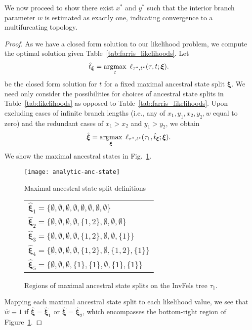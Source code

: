 We now proceed to show there exist $x^*$ and $y^*$ such that the interior branch parameter $w$ is estimated as exactly one, indicating convergence to a multifurcating topology.

\topoInconsist*

\begin{proof}
As we have a closed form solution to our likelihood problem, we compute the optimal solution given Table~\ref{tab:farris_likelihoods}.
Let
\[
\hat{t}_{\boldsymbol\xi} = \operatorname*{argmax}_{t} \ \ell_{\tau^*,t^*}(\tau, t; \boldsymbol\xi).
\]
be the closed form solution for $t$ for a fixed maximal ancestral state split $\boldsymbol\xi$.
We need only consider the possibilities for choices of ancestral state splits in Table~\ref{tab:likelihoods} as opposed to Table~\ref{tab:farris_likelihoods}.
Upon excluding cases of infinite branch lengths (i.e., any of $x_1,y_1,x_2,y_2,w$ equal to zero) and the redundant cases of $x_1 > x_2$ and $y_1 > y_2$, we obtain
\[
\hat{\boldsymbol\xi} =
    \operatorname*{argmax}_{\boldsymbol\xi} \ \ell_{\tau^*,t^*}(\tau_1, \hat{t}_{\boldsymbol\xi}; \boldsymbol\xi).
\]
We show the maximal ancestral states in Fig.~\ref{fig:max-anc-state}.

\begin{figure}
    \begin{minipage}{0.95\linewidth}
        \centering
        \texttt{[image: analytic-anc-state]}
        \label{ }
    \end{minipage}
    \begin{minipage}{0.95\linewidth}
        \centering
        Maximal ancestral state split definitions
        \begin{tabular}{l}
        \hline
        $\hat{\boldsymbol\xi}_1=\{\emptyset, \emptyset, \emptyset, \emptyset, \emptyset, \emptyset, \emptyset, \emptyset\}$\\
        $\hat{\boldsymbol\xi}_2=\{\emptyset, \emptyset, \emptyset, \emptyset, \{1,2\}, \emptyset, \emptyset, \emptyset\}$\\
        $\hat{\boldsymbol\xi}_3=\{\emptyset, \emptyset, \emptyset, \emptyset, \{1,2\}, \emptyset, \emptyset, \{1\}\}$\\
        $\hat{\boldsymbol\xi}_4=\{\emptyset, \emptyset, \emptyset, \emptyset, \{1,2\}, \emptyset, \{1,2\}, \{1\}\}$\\
        $\hat{\boldsymbol\xi}_5=\{\emptyset, \emptyset, \emptyset, \{1\}, \{1\}, \emptyset, \{1\}, \{1\}\}$\\
        \hline
        \end{tabular}
    \end{minipage}
\caption{
Regions of maximal ancestral state splits on the InvFels tree $\tau_1$.
}
\label{fig:max-anc-state}
\end{figure}

Mapping each maximal ancestral state split to each likelihood value, we see that $\hat{w}\equiv 1$ if $\hat{\boldsymbol\xi}=\hat{\boldsymbol\xi}_1$ or $\hat{\boldsymbol\xi}=\hat{\boldsymbol\xi}_2$, which encompasses the bottom-right region of Figure~\ref{fig:max-anc-state}.
\end{proof}

